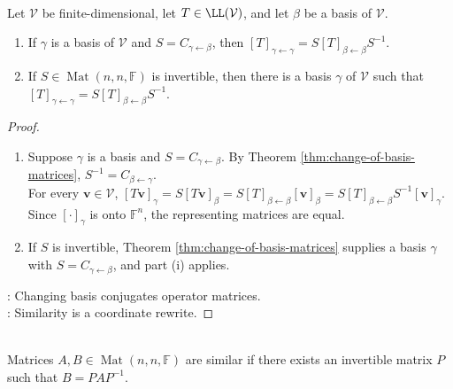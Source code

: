 \begin{theorem} \label{thm:change-of-basis-formula} \\
Let $\mathcal{V}$ be finite-dimensional, let $T \in \LL(\mathcal{V})$, and let $\beta$ be a basis of $\mathcal{V}$.
\begin{enumerate}[label=(\roman*)]
\setlength{\itemsep}{0pt}
\item If $\gamma$ is a basis of $\mathcal{V}$ and $S=C_{\gamma \leftarrow \beta}$, then $[T]_{\gamma \leftarrow \gamma} = S[T]_{\beta \leftarrow \beta}S^{-1}$.
\item If $S\in\operatorname{Mat}(n,n,\mathbb{F})$ is invertible, then there is a basis $\gamma$ of $\mathcal{V}$ such that $[T]_{\gamma \leftarrow \gamma} = S[T]_{\beta \leftarrow \beta}S^{-1}$.
\end{enumerate}
\begin{proof}
\begin{enumerate}[label=(\roman*)]
\setlength{\itemsep}{0pt}
\item Suppose $\gamma$ is a basis and $S=C_{\gamma \leftarrow \beta}$. By Theorem \ref{thm:change-of-basis-matrices}, $S^{-1}=C_{\beta \leftarrow \gamma}$.\\
For every $\mathbf{v}\in\mathcal{V}$, $[T\mathbf{v}]_{\gamma} =S[T\mathbf{v}]_{\beta} =S[T]_{\beta \leftarrow \beta}[\mathbf{v}]_{\beta} =S[T]_{\beta \leftarrow \beta}S^{-1}[\mathbf{v}]_{\gamma}$.\\
Since $[\cdot]_{\gamma}$ is onto $\mathbb{F}^n$, the representing matrices are equal.
\item If $S$ is invertible, Theorem \ref{thm:change-of-basis-matrices} supplies a basis $\gamma$ with $S=C_{\gamma \leftarrow \beta}$, and part (i) applies.
\end{enumerate}
: Changing basis conjugates operator matrices.\\
: Similarity is a coordinate rewrite.
\end{proof}
\end{theorem}

\begin{definition} \label{def:similar-matrices} \\
Matrices $A,B \in \operatorname{Mat}(n,n,\mathbb{F})$ are similar if there exists an invertible matrix $P$ such that $B = PAP^{-1}$.
\end{definition}

